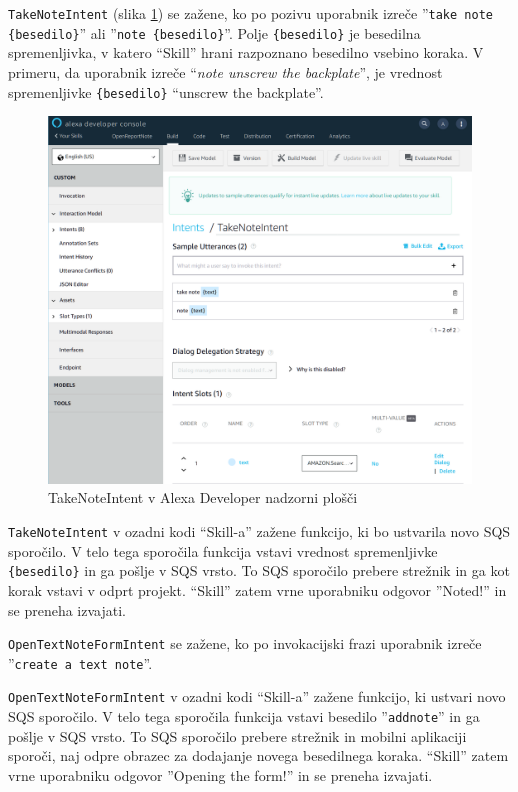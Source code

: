 \documentclass[a4paper, 12pt]{book}
\begin{document}
\texttt{TakeNoteIntent} (slika \ref{TakeNoteIntent}) se zažene, ko po pozivu uporabnik izreče ''\texttt{take note \{besedilo\}}'' ali ''\texttt{note \{besedilo\}}''.
Polje \texttt{\{besedilo\}} je besedilna spremenljivka, v katero \enquote{Skill} hrani razpoznano besedilno vsebino koraka.
V primeru, da uporabnik izreče \enquote{\textit{note unscrew the backplate}}, je vrednost spremenljivke \texttt{\{besedilo\}} \enquote{unscrew the backplate}.

\begin{figure}[H]
\begin{center}
\includegraphics[width=13cm]{intent_literal}
\end{center}
\caption{TakeNoteIntent v Alexa Developer nadzorni plošči}
\label{TakeNoteIntent}
\end{figure}

\texttt{TakeNoteIntent} v ozadni kodi \enquote{Skill-a} zažene funkcijo, ki bo ustvarila novo SQS sporočilo.
V telo tega sporočila funkcija vstavi vrednost spremenljivke \texttt{\{besedilo\}} in ga pošlje v SQS vrsto.
To SQS sporočilo prebere strežnik in ga kot korak vstavi v odprt projekt.
\enquote{Skill} zatem vrne uporabniku odgovor ''Noted!'' in se preneha izvajati.

\texttt{OpenTextNoteFormIntent} se zažene, ko po invokacijski frazi uporabnik izreče ''\texttt{create a text note}''.

\texttt{OpenTextNoteFormIntent} v ozadni kodi \enquote{Skill-a} zažene funkcijo, ki ustvari novo SQS sporočilo.
V telo tega sporočila funkcija vstavi besedilo ''\texttt{addnote}'' in ga pošlje v SQS vrsto.
To SQS sporočilo prebere strežnik in mobilni aplikaciji sporoči, naj odpre obrazec za dodajanje novega besedilnega koraka.
\enquote{Skill} zatem vrne uporabniku odgovor ''Opening the form!'' in se preneha izvajati.
\end{document}
